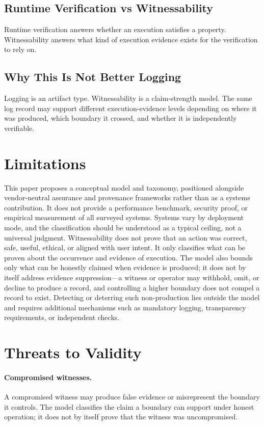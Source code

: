 \documentclass[11pt]{article}
\begin{document}
\subsection{Runtime Verification vs Witnessability}
Runtime verification answers whether an execution satisfies a property. Witnessability answers what kind of execution evidence exists for the verification to rely on.

\subsection{Why This Is Not Better Logging}
Logging is an artifact type. Witnessability is a claim-strength model. The same log record may support different execution-evidence levels depending on where it was produced, which boundary it crossed, and whether it is independently verifiable.

\section{Limitations}

This paper proposes a conceptual model and taxonomy, positioned alongside vendor-neutral assurance and provenance frameworks rather than as a systems contribution. It does not provide a performance benchmark, security proof, or empirical measurement of all surveyed systems. Systems vary by deployment mode, and the classification should be understood as a typical ceiling, not a universal judgment. Witnessability does not prove that an action was correct, safe, useful, ethical, or aligned with user intent. It only classifies what can be proven about the occurrence and evidence of execution. The model also bounds only what can be honestly claimed when evidence is produced; it does not by itself address evidence suppression---a witness or operator may withhold, omit, or decline to produce a record, and controlling a higher boundary does not compel a record to exist. Detecting or deterring such non-production lies outside the model and requires additional mechanisms such as mandatory logging, transparency requirements, or independent checks.

\section{Threats to Validity}

\paragraph{Compromised witnesses.} A compromised witness may produce false evidence or misrepresent the boundary it controls. The model classifies the claim a boundary can support under honest operation; it does not by itself prove that the witness was uncompromised.
\end{document}

